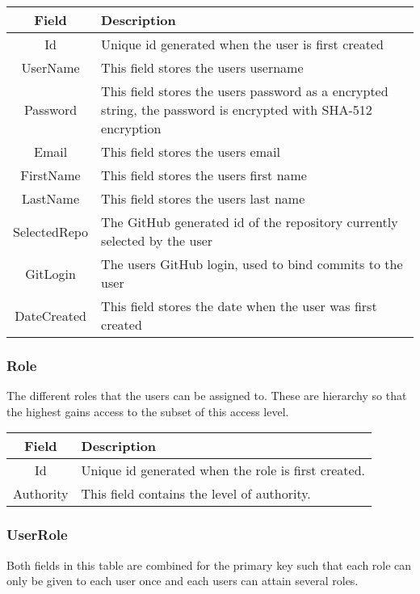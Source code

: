 \vspace{0.5cm}
\begin{tabularx}{\linewidth}{| c | X |}
    \hline
    \rowcolor[gray]{0.8}
    \textbf{Field} & \textbf{Description} \\
    \hline
    Id & Unique id generated when the user is first created\\ \hline
    UserName & This field stores the users username\\ \hline
   	Password & This field stores the users password as a encrypted string, the password is encrypted with SHA-512 encryption\\ \hline
    Email & This field stores the users email\\ \hline
    FirstName & This field stores the users first name\\ \hline
    LastName & This field stores the users last name\\ \hline
    SelectedRepo & The GitHub generated id of the repository currently selected by the user\\ \hline
    GitLogin & The users GitHub login, used to bind commits to the user\\ \hline
    DateCreated & This field stores the date when the user was first created\\
    \hline
\end{tabularx}
\vspace{0.5cm}

\subsubsection*{Role}
The different roles that the users can be assigned to. These are hierarchy so that the highest gains access to the subset of this access level. \\

\vspace{0.5cm}
\begin{tabularx}{\linewidth}{| c | X |}
    \hline
    \rowcolor[gray]{0.8}
    \textbf{Field} & \textbf{Description} \\
    \hline
    Id & Unique id generated when the role is first created.\\ \hline
    Authority & This field contains the level of authority.\\
    \hline
\end{tabularx}
\vspace{0.5cm}

\subsubsection*{UserRole}
Both fields in this table are combined for the primary key such that each role can only be given to each user once and each users can attain several roles. \\

